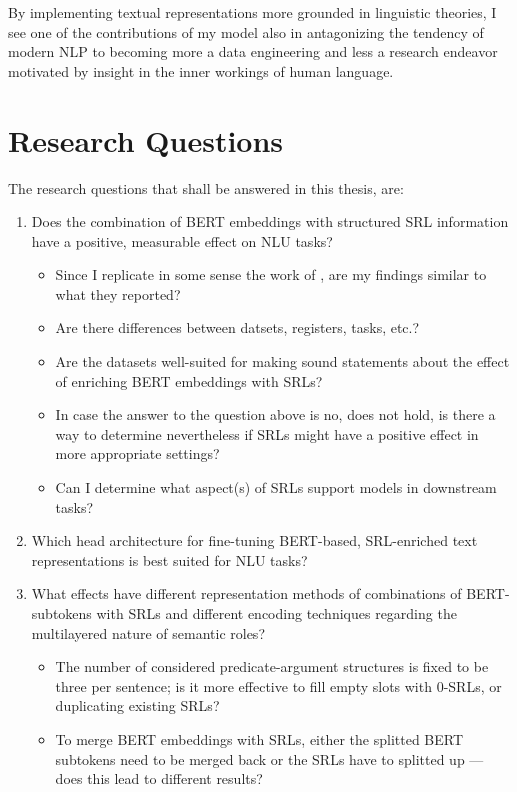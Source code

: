 By implementing textual representations more grounded in linguistic theories, I see one of the
contributions of my model also in antagonizing the tendency of modern NLP to becoming more a
data engineering and less a research endeavor motivated by insight in the inner workings
of human language.



\section{Research Questions}

The research questions that shall be answered in this thesis, are:

\begin{enumerate}
  \item \label{ques:one} Does the combination of  BERT embeddings with structured SRL information have a positive,
                         measurable effect on NLU tasks?
    \begin{itemize}
      \item Since I replicate in some sense the work of \cite{zhang2019semantics}, are my findings similar to what they reported?
      \item Are there differences between datsets, registers, tasks, etc.?
      \item Are the datasets well-suited for making sound statements about the effect of enriching BERT embeddings with SRLs?
      \item In case the answer to the question above is no, does not hold, is there a way to determine nevertheless if SRLs might have a positive effect in more appropriate settings?
      \item Can I determine what aspect(s) of SRLs support models in downstream tasks?
    \end{itemize}
  \item \label{ques:two} Which head architecture for fine-tuning BERT-based, SRL-enriched text representations is best suited for
                          NLU tasks?
  \item \label{ques:three} What effects have different representation methods of combinations of BERT-subtokens with SRLs and different encoding techniques regarding the multilayered nature of semantic roles?
    \begin{itemize}
      \item The number of considered predicate-argument
            structures is fixed to be three per sentence; is it more effective to fill empty slots with
            0-SRLs, or duplicating existing SRLs?
      \item To merge BERT embeddings with SRLs, either
            the splitted BERT subtokens need to be merged back or the SRLs have to splitted up --- does
            this lead to different results?
    \end{itemize}

\end{enumerate}



